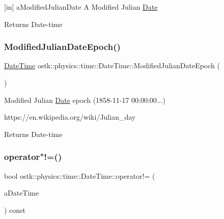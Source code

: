 \mbox{[}in\mbox{]} a\+Modified\+Julian\+Date A Modified Julian \hyperlink{classostk_1_1physics_1_1time_1_1_date}{Date} \begin{DoxyReturn}{Returns}
Date-\/time 
\end{DoxyReturn}
\mbox{\label{classostk_1_1physics_1_1time_1_1_date_time_a21b33a253f185060eb898f6d7d760706}} 
\subsubsection{\texorpdfstring{Modified\+Julian\+Date\+Epoch()}{ModifiedJulianDateEpoch()}}
{\footnotesize\ttfamily \hyperlink{classostk_1_1physics_1_1time_1_1_date_time}{Date\+Time} ostk\+::physics\+::time\+::\+Date\+Time\+::\+Modified\+Julian\+Date\+Epoch (\begin{DoxyParamCaption}{ }\end{DoxyParamCaption})\hspace{0.3cm}{\ttfamily [static]}}



Modified Julian \hyperlink{classostk_1_1physics_1_1time_1_1_date}{Date} epoch (1858-\/11-\/17 00\+:00\+:00...) 

https\+://en.wikipedia.\+org/wiki/\+Julian\+\_\+day

\begin{DoxyReturn}{Returns}
Date-\/time 
\end{DoxyReturn}
\mbox{\label{classostk_1_1physics_1_1time_1_1_date_time_ae96358ed48be6bb4325d3f3408a8ab5c}} 
\subsubsection{\texorpdfstring{operator"!=()}{operator!=()}}
{\footnotesize\ttfamily bool ostk\+::physics\+::time\+::\+Date\+Time\+::operator!= (\begin{DoxyParamCaption}\item[{const \hyperlink{classostk_1_1physics_1_1time_1_1_date_time}{Date\+Time} \&}]{a\+Date\+Time }\end{DoxyParamCaption}) const}



